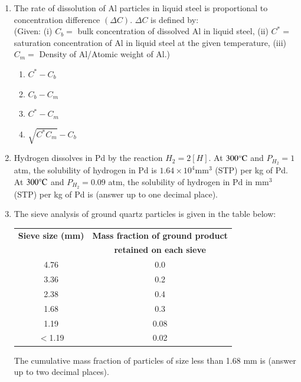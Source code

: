 \documentclass[journal]{IEEEtran}
\theoremstyle{remark}
\begin{document}
\begin{enumerate}
\item The rate of dissolution of Al particles in liquid steel is proportional to concentration difference $(\Delta C)$. $\Delta C$ is defined by:\\ (Given: (i) $C_b = $ bulk concentration of dissolved Al in liquid steel, (ii) $C^* = $ saturation concentration of Al in liquid steel at the given temperature, (iii) $C_m = $ Density of Al/Atomic weight of Al.) \hfill{}
\begin{multicols}{4}
\begin{enumerate}
    \item $C^* - C_b$
    \item $C_b - C_m$
    \item $C^* - C_m$
    \item $\sqrt{C^*C_m} - C_b$
\end{enumerate}
\end{multicols}

\item Hydrogen dissolves in Pd by the reaction $H_2 = 2[H]$. At $300\degree\text{C}$ and $P_{H_2}=1$ atm, the solubility of hydrogen in Pd is $1.64 \times 10^4 \text{mm}^3$ (STP) per kg of Pd. At $300\degree\text{C}$ and $P_{H_2}=0.09$ atm, the solubility of hydrogen in Pd in $\text{mm}^3$ (STP) per kg of Pd is \underline {\hspace{2cm}} (answer up to one decimal place). \hfill{}

\item The sieve analysis of ground quartz particles is given in the table below:
\begin{center}
\begin{tabular}{|c|c|}
\hline
\textbf{Sieve size (mm)} & \textbf{Mass fraction of ground product} \\
& \textbf{retained on each sieve} \\
\hline
4.76 & 0.0 \\
3.36 & 0.2 \\
2.38 & 0.4 \\
1.68 & 0.3 \\
1.19 & 0.08 \\
$<$1.19 & 0.02 \\
\hline
\end{tabular}
\end{center}
The cumulative mass fraction of particles of size less than 1.68 mm is \underline {\hspace{2cm}} (answer up to two decimal places). \hfill{}


\end{enumerate}
\end{document}
